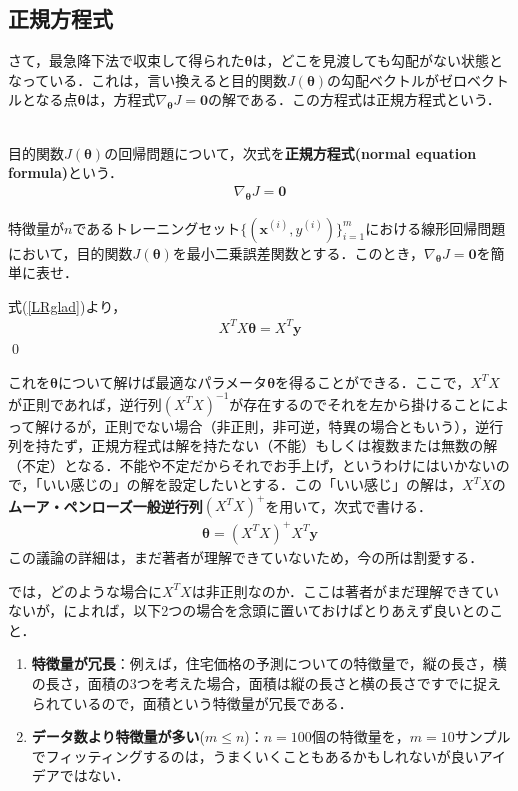 \subsection{正規方程式}

さて，最急降下法で収束して得られた${\bm \theta}$は，どこを見渡しても勾配がない状態となっている．これは，言い換えると目的関数$J({\bm \theta})$の勾配ベクトルがゼロベクトルとなる点${\bm \theta}$は，方程式$\nabla_{{\bm \theta}}J={\bm 0}$の解である．この方程式は正規方程式という．
\begin{defi}[正規方程式]
　\\
目的関数$J({\bm \theta})$の回帰問題について，次式を{\bf 正規方程式(normal equation formula)}という．
\begin{align}
\nabla_{{\bm \theta}}J={\bm 0}
\end{align}
\end{defi}

\begin{qu}
特徴量が$n$であるトレーニングセット$\{({\bm x}^{(i)},y^{(i)})\}_{i=1}^m$における線形回帰問題において，目的関数$J({\bm \theta})$を最小二乗誤差関数とする．このとき，$\nabla_{{\bm \theta}}J={\bm 0}$を簡単に表せ．
\end{qu}
\begin{ans}
式(\ref{LRglad})より，
\begin{align}
X^TX{\bm \theta}=X^T{\bm y}	
\end{align}\qed
\end{ans}
これを${\bm \theta}$について解けば最適なパラメータ${\bm \theta}$を得ることができる．ここで，$X^TX$が正則であれば，逆行列$(X^TX)^{-1}$が存在するのでそれを左から掛けることによって解けるが，正則でない場合（非正則，非可逆，特異の場合ともいう），逆行列を持たず，正規方程式は解を持たない（不能）もしくは複数または無数の解（不定）となる．不能や不定だからそれでお手上げ，というわけにはいかないので，「いい感じの」の解を設定したいとする．この「いい感じ」の解は，$X^TX$の{\bf ムーア・ペンローズ一般逆行列}$(X^TX)^+$を用いて，次式で書ける．
\begin{align}
{\bm \theta}=(X^TX)^+ X^T{\bm y}
\end{align}
この議論の詳細は，まだ著者が理解できていないため，今の所は割愛する．

では，どのような場合に$X^TX$は非正則なのか．ここは著者がまだ理解できていないが，\cite{AndrewML}によれば，以下2つの場合を念頭に置いておけばとりあえず良いとのこと．
\begin{enumerate}
\item {\bf 特徴量が冗長}：例えば，住宅価格の予測についての特徴量で，縦の長さ，横の長さ，面積の3つを考えた場合，面積は縦の長さと横の長さですでに捉えられているので，面積という特徴量が冗長である．
\item {\bf データ数より特徴量が多い}($m \leq n$)：$n=100$個の特徴量を，$m=10$サンプルでフィッティングするのは，うまくいくこともあるかもしれないが良いアイデアではない．
\end{enumerate}


